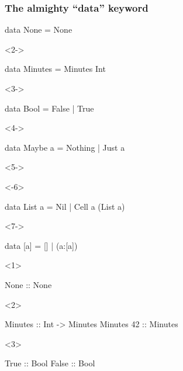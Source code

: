 \documentclass[17pt]{beamer}
\renewcommand{\(}[1]{\begin{columns}[#1]}
\renewcommand{\)}{\end{columns}}
\newcommand{\<}[1]{\begin{column}{#1}}
\renewcommand{\>}{\end{column}}
\begin{document}
\begin{frame}[fragile]
\frametitle{The almighty ``data'' keyword}
\begin{code}
    data None    = None
\end{code}
\begin{uncoverenv}<2->
\begin{code}
    data Minutes = Minutes Int
\end{code}
\end{uncoverenv}
\begin{uncoverenv}<3->
\begin{code}
    data Bool    =   False | True
\end{code}
\end{uncoverenv}
\begin{uncoverenv}<4->
\begin{code}
    data Maybe a = Nothing | Just a
\end{code}
\end{uncoverenv}
\begin{uncoverenv}<5->
\begin{onlyenv}<-6>
\begin{code}
    data List  a =     Nil | Cell a (List a)
\end{code}
\end{onlyenv}
\begin{onlyenv}<7->
\begin{code}
    data [a]     =      [] | (a:[a])
\end{code}
\end{onlyenv}
\end{uncoverenv}
\begin{minipage}[t][.3\textheight]{\textwidth}
\begin{center}
\begin{onlyenv}<1>
\begin{code}
                      None :: None
\end{code}
\end{onlyenv}
\begin{onlyenv}<2>
\begin{code}
                Minutes    :: Int -> Minutes
                Minutes 42 ::        Minutes
\end{code}
\end{onlyenv}
\begin{onlyenv}<3>
\begin{code}
                     True  :: Bool
                     False :: Bool
\end{code}

\end{onlyenv}
\end{center}
\end{minipage}
\end{frame}
\end{document}
